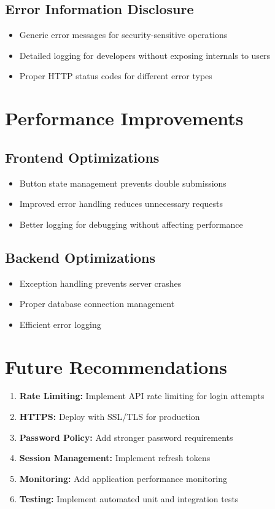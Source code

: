 \documentclass[12pt,a4paper]{article}
\begin{document}
\subsection{Error Information Disclosure}
\begin{itemize}
    \item Generic error messages for security-sensitive operations
    \item Detailed logging for developers without exposing internals to users
    \item Proper HTTP status codes for different error types
\end{itemize}

\section{Performance Improvements}

\subsection{Frontend Optimizations}
\begin{itemize}
    \item Button state management prevents double submissions
    \item Improved error handling reduces unnecessary requests
    \item Better logging for debugging without affecting performance
\end{itemize}

\subsection{Backend Optimizations}
\begin{itemize}
    \item Exception handling prevents server crashes
    \item Proper database connection management
    \item Efficient error logging
\end{itemize}

\section{Future Recommendations}

\begin{enumerate}
    \item \textbf{Rate Limiting:} Implement API rate limiting for login attempts
    \item \textbf{HTTPS:} Deploy with SSL/TLS for production
    \item \textbf{Password Policy:} Add stronger password requirements
    \item \textbf{Session Management:} Implement refresh tokens
    \item \textbf{Monitoring:} Add application performance monitoring
    \item \textbf{Testing:} Implement automated unit and integration tests
\end{enumerate}
\end{document}
